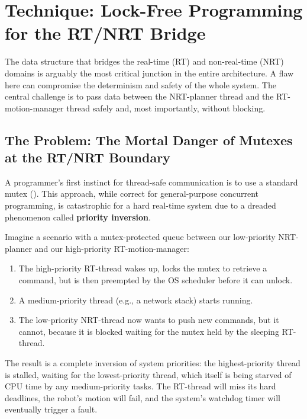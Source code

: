 
\section{Technique: Lock-Free Programming for the RT/NRT Bridge}
\label{sec:lock_free_conceptual}

The data structure that bridges the real-time (RT) and non-real-time (NRT) domains is arguably the most critical junction in the entire architecture. A flaw here can compromise the determinism and safety of the whole system. The central challenge is to pass data between the NRT-planner thread and the RT-motion-manager thread safely and, most importantly, without blocking.

\subsection{The Problem: The Mortal Danger of Mutexes at the RT/NRT Boundary}
\label{subsec:mutex_danger_conceptual}

A programmer's first instinct for thread-safe communication is to use a standard mutex (). This approach, while correct for general-purpose concurrent programming, is catastrophic for a hard real-time system due to a dreaded phenomenon called \textbf{priority inversion}.

Imagine a scenario with a mutex-protected queue between our low-priority NRT-planner and our high-priority RT-motion-manager:
\begin{enumerate}
    \item The high-priority RT-thread wakes up, locks the mutex to retrieve a command, but is then preempted by the OS scheduler before it can unlock.
    \item A medium-priority thread (e.g., a network stack) starts running.
    \item The low-priority NRT-thread now wants to push new commands, but it cannot, because it is blocked waiting for the mutex held by the sleeping RT-thread.
\end{enumerate}
The result is a complete inversion of system priorities: the highest-priority thread is stalled, waiting for the lowest-priority thread, which itself is being starved of CPU time by any medium-priority tasks. The RT-thread will miss its hard deadlines, the robot's motion will fail, and the system's watchdog timer will eventually trigger a fault.

